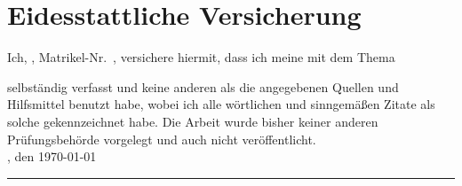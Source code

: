 
\chapter*{Eidesstattliche Versicherung}

\thispagestyle{empty}

Ich, \autor, Matrikel-Nr.\ \matrikelnr, versichere hiermit, dass ich meine \art\xspace mit dem Thema
\begin{quote}
\textit{\titel} \textit{\untertitel}
\end{quote}
selbständig verfasst und keine anderen als die angegebenen Quellen und Hilfsmittel benutzt habe, wobei ich alle wörtlichen und sinngemäßen Zitate als solche gekennzeichnet habe. Die Arbeit wurde bisher keiner anderen Prüfungsbehörde vorgelegt und auch nicht veröffentlicht. \\[6ex]

\ort, den \today\\[3ex]


\rule[-0.2cm]{5cm}{0.5pt}

\textsc{\autor} 
